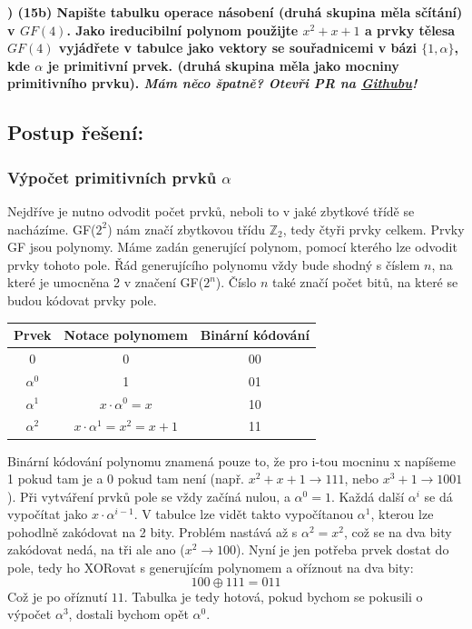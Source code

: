 \documentclass[10pt,a4paper]{article}
\newcommand{\footer}{{\small\em Mám něco špatně? Otevři PR na \href{https://github.com/kosciCZ/MAT-GF}{Githubu}!}}
\begin{document}
\bfseries{}) (15b) Napište tabulku operace násobení (druhá skupina měla sčítání) v $GF(4)$. Jako ireducibilní  polynom použijte $x^2 + x + 1$ a prvky tělesa $GF(4)$ vyjádřete v tabulce jako vektory se souřadnicemi v bázi $\lbrace 1,\alpha \rbrace$, kde $\alpha$ je primitivní prvek. (druhá skupina měla jako mocniny primitivního prvku).\normalfont
 \footer
\subsection*{Postup řešení:}
\subsubsection*{Výpočet primitivních prvků $\alpha$}
Nejdříve je nutno odvodit počet prvků, neboli to v jaké zbytkové třídě se nacházíme. GF($2^{2}$) nám značí zbytkovou třídu $\mathbb{Z}_{2}$, tedy čtyři prvky celkem. Prvky GF jsou polynomy. Máme zadán generující polynom, pomocí kterého lze odvodit prvky tohoto pole. Řád generujícího polynomu vždy bude shodný s číslem $n$, na které je umocněna 2 v značení GF($2^{n}$). Číslo $n$ také značí počet bitů, na které se budou kódovat prvky pole.

\renewcommand{\arraystretch}{1.5}%
\begin{table}[h]
	\centering
	\begin{tabular}{|c|c|c|}
		\hline
		\textbf{Prvek} & \textbf{Notace polynomem} & \textbf{Binární kódování} \\\hline
		0 & 0 & 00 \\\hline 
		$\alpha^{0}$ &  1 & 01 \\\hline 
		$\alpha^{1}$ & $x\cdot\alpha^{0}=x$ & 10 \\\hline 
		$\alpha^{2}$ & $x\cdot\alpha^{1}=x^{2} = x + 1$ & 11 \\\hline 
	\end{tabular}
\end{table}

Binární kódování polynomu znamená pouze to, že pro i-tou mocninu x napíšeme 1 pokud tam je a 0 pokud tam není (např. $x^2 + x + 1 \to 111$, nebo $x^3 + 1 \to 1001$). Při vytváření prvků pole se vždy začíná nulou, a $\alpha^{0} = 1$. Každá další $\alpha^{i}$ se dá vypočítat jako $x\cdot\alpha^{i-1}$. V tabulce lze vidět takto vypočítanou $\alpha^{1}$, kterou lze pohodlně zakódovat na 2 bity. Problém nastává až s $\alpha^{2} = x^{2}$, což se na dva bity zakódovat nedá, na tři ale ano ($x^{2} \to 100$). Nyní je jen potřeba prvek dostat do pole, tedy ho XORovat s generujícím polynomem a oříznout na dva bity:
$$ 100 \oplus 111 = 011 $$
Což je po oříznutí $11$. Tabulka je tedy hotová, pokud bychom se pokusili o výpočet $\alpha^{3}$, dostali bychom opět $\alpha^{0}$.
\end{document}
